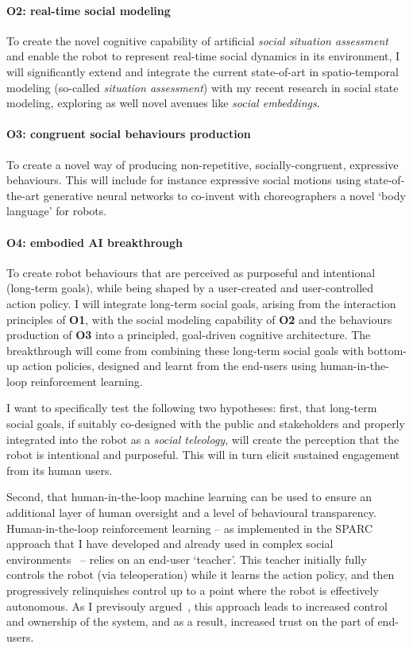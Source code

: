 \paragraph{\bf O2: real-time social modeling} To create the novel cognitive
capability of artificial \emph{social situation assessment} and enable the
robot to represent real-time social dynamics in its environment, I will
significantly extend and integrate the current state-of-art in spatio-temporal
modeling (so-called \emph{situation assessment}) with my recent research in social
state modeling, exploring as well novel avenues like \emph{social embeddings}.

\paragraph{\bf O3: congruent social behaviours production} 
To create a novel way of producing non-repetitive, socially-congruent,
expressive behaviours. This will include for instance expressive social motions using
state-of-the-art generative neural networks to co-invent with choreographers
a novel `body language' for robots.

\paragraph{\bf O4: embodied AI breakthrough} To create robot behaviours that are
perceived as purposeful and intentional (long-term goals), while being shaped by
a user-created and user-controlled action policy. I will integrate long-term
social goals, arising from the interaction principles of \textbf{O1}, with the
social modeling capability of \textbf{O2} and the behaviours production of
\textbf{O3} into a principled, goal-driven cognitive architecture. The
breakthrough will come from combining these long-term social goals with
bottom-up action policies, designed and learnt from the end-users using
human-in-the-loop reinforcement learning.

I want to specifically test the following two hypotheses: first, that long-term
social goals, if suitably co-designed with the public and stakeholders and
properly integrated into the robot as a \emph{social teleology}, will create the
perception that the robot is intentional and purposeful. This will in turn
elicit sustained engagement from its human users.

Second, that human-in-the-loop machine learning can
be used to ensure an additional layer of human oversight and a level of
behavioural transparency.  Human-in-the-loop reinforcement learning -- as
implemented in the SPARC approach that I have developed and already used in
complex social
environments~\parencite{senft2017supervised,senft2019teaching,winkle2020insitu}
-- relies on an end-user `teacher'. This teacher initially fully controls the
robot (via teleoperation) while it learns the action policy, and then
progressively relinquishes control up to a point where the robot is effectively
autonomous. As I previsouly argued~\parencite{senft2019teaching}, this approach
leads to increased control and ownership of the system, and as a result,
increased trust on the part of end-users.

